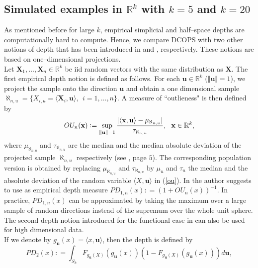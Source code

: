 \documentclass[a4paper]{article}
\newcommand{\X}{ \textbf{X}}
\def\defeq{\mathrel{\mathop:}=}
\numberwithin{equation}{section}
\def\defeq{\mathrel{\mathop:}=}
\begin{document}
\subsection{Simulated examples in $\mathbb{R}^k$ with $k=5$ and $k=20$}
As mentioned before for large $k$, empirical simplicial and half--space depths are computationally hard to compute. Hence, we compare DCOPS with  two other notions of depth that has been introduced in \cite{liu1992} and \cite{fraiman2009}, respectively. These notions are based on one--dimensional projections.
\\
Let $\X_1, \ldots, \X_n \in \mathbb R^k$ be iid random vectors with the same distribution as $\X$.   The first empirical depth notion is defined as follows. 
For each $\textbf{u} \in \mathbb R^k$ ($\Vert \textbf{u} \Vert =1$), we project the sample onto the direction $\textbf{u}$ and obtain a one dimensional sample
$\aleph_{n,u} = \{X_{i,u}= \langle \X_i, \textbf{u}\rangle, \ \   i=1,\ldots,n\}$.
A measure of ``outlieness" is then defined by 
\begin{equation}{\label{ou}} OU_n(\mathbf x)  \defeq \sup_{\substack{\Vert \textbf{u} \Vert=1}}   \frac{\vert \langle \mathbf x,\textbf{u} \rangle  - \mu_{\aleph_{n,u}}  \vert}{\tau_{\aleph_{n,u}}}, \ \ \mathbf x \in \mathbb R^k,
\end{equation}
where $\mu_{\aleph_{n,u}}$ and $\tau_{\aleph_{n,u}}$ are the median  and  the median absolute deviation  of the projected sample $\aleph_{n,u}$ respectively (see \cite{maronna2006}, page $5$). The corresponding population version is obtained by replacing  $\mu_{\aleph_{n,u}}$ and $\tau_{\aleph_{n,u}}$ by $\mu_u$ and $\tau_u$ the median and the absolute deviation of the random variable $\langle X, \mathbf u\rangle$ in (\ref{ou}). 
In \cite{liu1992} the author suggests to use as  empirical depth measure %
$PD_{1,n} (x) \defeq  \left( 1+OU_n(x) \right)^{-1}$.
In practice, $PD_{1,n} (x)$ can be approximated by taking the maximum over a large sample of random directions instead of the supremum over the whole unit sphere.  
\\
The second depth notion introduced for the functional case in \cite{fraiman2009} can also be used for high dimensional data. 
\\
If we denote by  $g_{\textbf{u}}(x)=\langle x, \textbf{u} \rangle$, then the depth is defined by 
 \begin{equation}
PD_{2}(x) \defeq   \int_{S_k} F_{g_{\textbf{u}}(X)} \left(g_{\textbf{u}}(x)\right)  \left(   1-  F_{g_{\textbf{u}}(X)} \left(g_{\textbf{u}}(x)\right)  \right) d\textbf{u},
 \end{equation}
\end{document}
